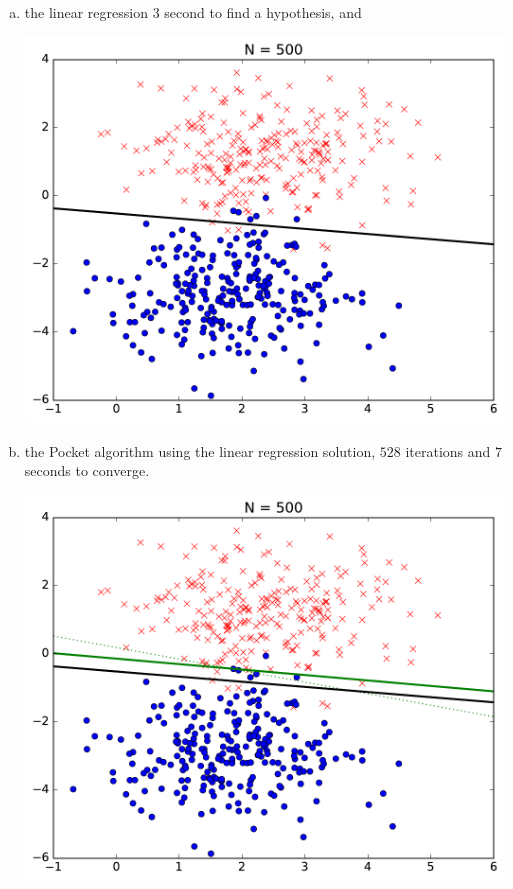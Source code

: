 \documentclass[a4paper]{article}
\begin{document}
\begin {description}
\begin{doublespace}
\begin{enumerate}[(a)]
\begin{center}
\end{center}
\item the linear regression $3$ second to find a hypothesis, and 
\begin{center}
\includegraphics[scale=0.5]{Trial_1/linear_regression.pdf}
\end{center}
\item  the Pocket algorithm using the linear regression solution, $528$ iterations and $7$ seconds to converge.
\begin{center}
\includegraphics[scale=0.5]{Trial_1/pocket_with_lr.pdf}
\end{center}
\end{enumerate}


\end{doublespace}
\end{description}
\end{document}
